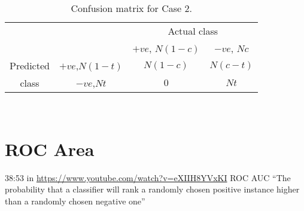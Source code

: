 \documentclass{article}
\begin{document}
\begin{table}
\begin{center}
  \begin{tabular}{cccc}
    \cline{3-4}
    & & \multicolumn{2}{|c|}{Actual class}  \\
    \cline{3-4}
    & & \multicolumn{1}{|c|}{$+ve$, $N(1-c)$} &  \multicolumn{1}{|c|}{$-ve$, $Nc$}\\
    \hline
    \multicolumn{1}{|c}{Predicted} & \multicolumn{1}{|c|}{$+ve$,$N(1-t)$} & \multicolumn{1}{|c|}{$N(1-c)$} & \multicolumn{1}{|c|}{$N(c-t)$} \\
    \cline{2-4}
    \multicolumn{1}{|c}{class} & \multicolumn{1}{|c|}{$-ve$,$Nt$} & \multicolumn{1}{|c|}{$0$} & \multicolumn{1}{|c|}{$Nt$}\\
    \hline
  \end{tabular}
\end{center}
\caption{\label{tab:confcase1} Confusion matrix for Case 2.}
\end{table}\\
%
%
\section{ROC Area}
38:53 in \url{https://www.youtube.com/watch?v=eXIIH8YVxKI} ROC AUC ``The probability that a classifier will rank a randomly chosen positive instance higher than a randomly chosen negative one''
%
%
\end{document}
